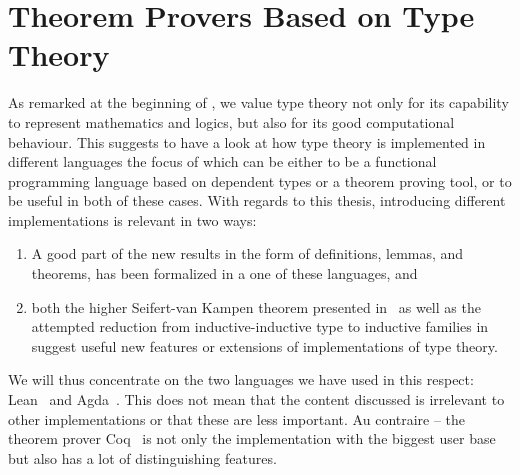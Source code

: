 \section{Theorem Provers Based on Type Theory}\label{sec:tt-provers}

As remarked at the beginning of , we value type theory not only
for its capability to represent mathematics and logics, but also for its good
computational behaviour.
This suggests to have a look at how type theory is implemented in different languages
the focus of which can be either to be a functional programming language based
on dependent types or a theorem proving tool, or to be useful in both of these cases.
With regards to this thesis, introducing different implementations is relevant
in two ways:
\begin{enumerate}
\item A good part of the new results in the form of definitions, lemmas,
and theorems, has been formalized in a one of these languages, and
\item both the higher Seifert-van Kampen theorem presented in~
as well as the attempted reduction from inductive-inductive type to inductive
families in ~ suggest useful new features or extensions of implementations
of type theory.
\end{enumerate}
We will thus concentrate on the two languages we have used in this respect:
Lean~\citep{mouracade} and Agda~\citep{agda}.
This does not mean that the content discussed is irrelevant to other implementations
or that these are less important.
Au contraire -- the theorem prover Coq~\citep{coq} is not only the implementation
with the biggest user base but also has a lot of distinguishing features.

